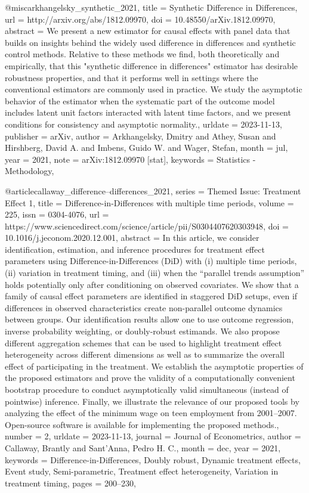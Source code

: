{@misc{arkhangelsky_synthetic_2021,
	title = {Synthetic {Difference} in {Differences}},
	url = {http://arxiv.org/abs/1812.09970},
	doi = {10.48550/arXiv.1812.09970},
	abstract = {We present a new estimator for causal effects with panel data that builds on insights behind the widely used difference in differences and synthetic control methods. Relative to these methods we find, both theoretically and empirically, that this "synthetic difference in differences" estimator has desirable robustness properties, and that it performs well in settings where the conventional estimators are commonly used in practice. We study the asymptotic behavior of the estimator when the systematic part of the outcome model includes latent unit factors interacted with latent time factors, and we present conditions for consistency and asymptotic normality.},
	urldate = {2023-11-13},
	publisher = {arXiv},
	author = {Arkhangelsky, Dmitry and Athey, Susan and Hirshberg, David A. and Imbens, Guido W. and Wager, Stefan},
	month = jul,
	year = {2021},
	note = {arXiv:1812.09970 [stat]},
	keywords = {Statistics - Methodology},
}

@article{callaway_difference--differences_2021,
	series = {Themed {Issue}: {Treatment} {Effect} 1},
	title = {Difference-in-{Differences} with multiple time periods},
	volume = {225},
	issn = {0304-4076},
	url = {https://www.sciencedirect.com/science/article/pii/S0304407620303948},
	doi = {10.1016/j.jeconom.2020.12.001},
	abstract = {In this article, we consider identification, estimation, and inference procedures for treatment effect parameters using Difference-in-Differences (DiD) with (i) multiple time periods, (ii) variation in treatment timing, and (iii) when the “parallel trends assumption” holds potentially only after conditioning on observed covariates. We show that a family of causal effect parameters are identified in staggered DiD setups, even if differences in observed characteristics create non-parallel outcome dynamics between groups. Our identification results allow one to use outcome regression, inverse probability weighting, or doubly-robust estimands. We also propose different aggregation schemes that can be used to highlight treatment effect heterogeneity across different dimensions as well as to summarize the overall effect of participating in the treatment. We establish the asymptotic properties of the proposed estimators and prove the validity of a computationally convenient bootstrap procedure to conduct asymptotically valid simultaneous (instead of pointwise) inference. Finally, we illustrate the relevance of our proposed tools by analyzing the effect of the minimum wage on teen employment from 2001–2007. Open-source software is available for implementing the proposed methods.},
	number = {2},
	urldate = {2023-11-13},
	journal = {Journal of Econometrics},
	author = {Callaway, Brantly and Sant’Anna, Pedro H. C.},
	month = dec,
	year = {2021},
	keywords = {Difference-in-Differences, Doubly robust, Dynamic treatment effects, Event study, Semi-parametric, Treatment effect heterogeneity, Variation in treatment timing},
	pages = {200--230},
}

}
